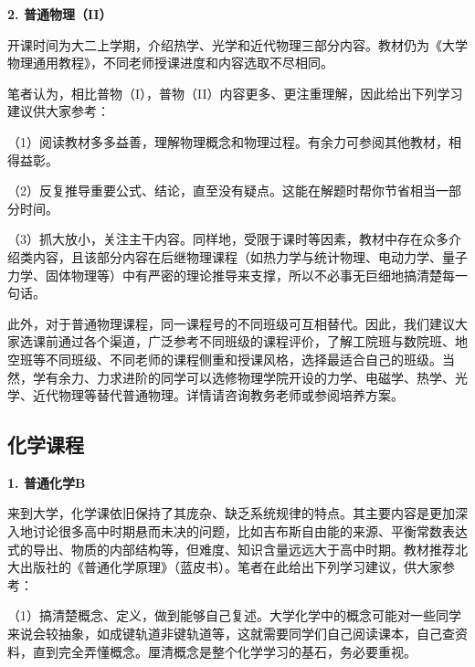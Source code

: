 \documentclass[11pt,oneside]{book}
\begin{document}
\vspace{10pt}

\textbf{2. 普通物理（II）}

开课时间为大二上学期，介绍热学、光学和近代物理三部分内容。教材仍为《大学物理通用教程》，不同老师授课进度和内容选取不尽相同。

\vspace{10pt}

笔者认为，相比普物（I），普物（II）内容更多、更注重理解，因此给出下列学习建议供大家参考：

\vspace{10pt}

（1）阅读教材多多益善，理解物理概念和物理过程。有余力可参阅其他教材，相得益彰。

\vspace{10pt}

（2）反复推导重要公式、结论，直至没有疑点。这能在解题时帮你节省相当一部分时间。

\vspace{10pt}

（3）抓大放小，关注主干内容。同样地，受限于课时等因素，教材中存在众多介绍类内容，且该部分内容在后继物理课程（如热力学与统计物理、电动力学、量子力学、固体物理等）中有严密的理论推导来支撑，所以不必事无巨细地搞清楚每一句话。

\vspace{10pt}

此外，对于普通物理课程，同一课程号的不同班级可互相替代。因此，我们建议大家选课前通过各个渠道，广泛参考不同班级的课程评价，了解工院班与数院班、地空班等不同班级、不同老师的课程侧重和授课风格，选择最适合自己的班级。当然，学有余力、力求进阶的同学可以选修物理学院开设的力学、电磁学、热学、光学、近代物理等替代普通物理。详情请咨询教务老师或参阅培养方案。

\subsection{化学课程}

\textbf{1. 普通化学B}

来到大学，化学课依旧保持了其庞杂、缺乏系统规律的特点。其主要内容是更加深入地讨论很多高中时期悬而未决的问题，比如吉布斯自由能的来源、平衡常数表达式的导出、物质的内部结构等，但难度、知识含量远远大于高中时期。教材推荐北大出版社的《普通化学原理》（蓝皮书）。笔者在此给出下列学习建议，供大家参考：

\vspace{10pt}

（1）搞清楚概念、定义，做到能够自己复述。大学化学中的概念可能对一些同学来说会较抽象，如成键轨道非键轨道等，这就需要同学们自己阅读课本，自己查资料，直到完全弄懂概念。厘清概念是整个化学学习的基石，务必要重视。
\end{document}
